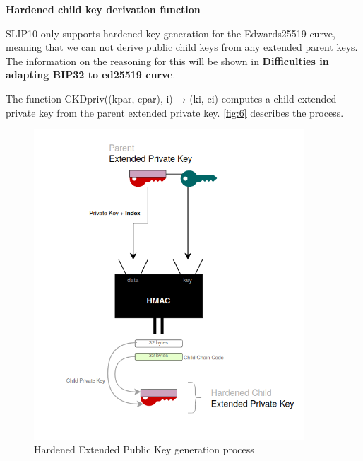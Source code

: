 \bigskip
{\textbf{Hardened child key derivation function}}

SLIP10 only supports hardened key generation for the Edwards25519 curve, meaning that we can not derive public child keys from any extended parent keys. The information on the reasoning for this will be shown in \textbf{Difficulties in adapting BIP32 to ed25519 curve}.

The function CKDpriv((kpar, cpar), i) → (ki, ci) computes a child extended private key from the parent extended private key. \autoref{fig:6} describes the process.

\bigskip
\begin{figure}[ht!]
    \centering
    \includegraphics[width=0.9\textwidth]{images/hard_child_slip10.png}
    \caption[Hardened Extended Public Key generation process]{Hardened Extended Public Key generation process}
    \label{fig:6}
\end{figure}

